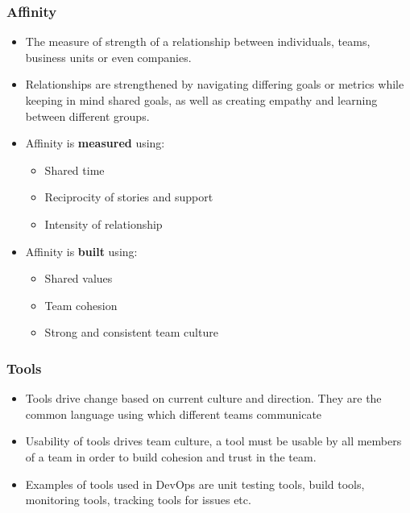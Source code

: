 \documentclass{article}
\begin{document}
\subsubsection{Affinity}
\begin{itemize}
    \item The measure of strength of a relationship between individuals, teams, business units or even companies. 
    
    \item Relationships are strengthened by navigating differing goals or metrics while keeping in mind shared goals, as well as creating empathy and learning between different groups.
    
    \item Affinity is \textbf{measured} using:
    \begin{itemize}
        \item Shared time
        
        \item Reciprocity of stories and support
        
        \item Intensity of relationship
    \end{itemize}
    
    \item Affinity is \textbf{built} using:
    \begin{itemize}
        \item Shared values
        
        \item Team cohesion
        
        \item Strong and consistent team culture
    \end{itemize}
\end{itemize}

\subsubsection{Tools}
\begin{itemize}
    \item Tools drive change based on current culture and direction. They are the common language using which different teams communicate
    
    \item Usability of tools drives team culture, a tool must be usable by all members of a team in order to build cohesion and trust in the team. 
    
    \item Examples of tools used in DevOps are unit testing tools, build tools, monitoring tools, tracking tools for issues etc.
\end{itemize}
\end{document}
